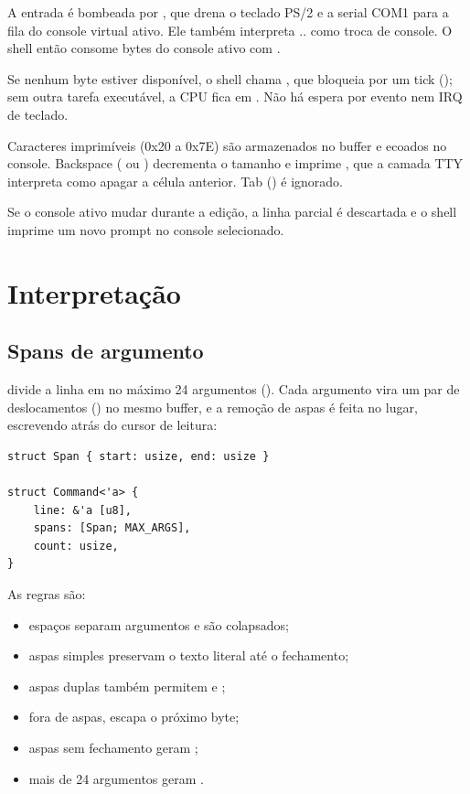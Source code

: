 A entrada \'e bombeada por , que drena o teclado PS/2 e
a serial COM1 para a fila do console virtual ativo. Ele tamb\'em interpreta
.. como troca de console. O shell ent\~ao consome
bytes do console ativo com .

Se nenhum byte estiver dispon\'ivel, o shell chama , que
bloqueia por um tick (); sem outra tarefa execut\'avel, a
CPU fica em . N\~ao h\'a espera por evento nem IRQ de teclado.

Caracteres imprim\'iveis (0x20 a 0x7E) s\~ao armazenados no buffer e ecoados
no console. Backspace ( ou ) decrementa o tamanho e
imprime , que a camada TTY interpreta como apagar
a c\'elula anterior. Tab () \'e ignorado.

Se o console ativo mudar durante a edi\c{c}\~ao, a linha parcial \'e
descartada e o shell imprime um novo prompt no console selecionado.

\section{Interpreta\c{c}\~ao}

\subsection{Spans de argumento}

 divide a linha em no m\'aximo 24 argumentos
(). Cada argumento vira um par de deslocamentos
() no mesmo buffer, e a remo\c{c}\~ao de aspas \'e feita no lugar,
escrevendo atr\'as do cursor de leitura:

\begin{lstlisting}[caption={Parsing de argumentos com aspas e escapes.},label={lst:parse}]
struct Span { start: usize, end: usize }

struct Command<'a> {
    line: &'a [u8],
    spans: [Span; MAX_ARGS],
    count: usize,
}
\end{lstlisting}

As regras s\~ao:

\begin{itemize}
  \item espa\c{c}os separam argumentos e s\~ao colapsados;
  \item aspas simples preservam o texto literal at\'e o fechamento;
  \item aspas duplas tamb\'em permitem  e
        \code{\textbackslash \textbackslash};
  \item fora de aspas, \code{\textbackslash} escapa o pr\'oximo byte;
  \item aspas sem fechamento geram ;
  \item mais de 24 argumentos geram .
\end{itemize}

